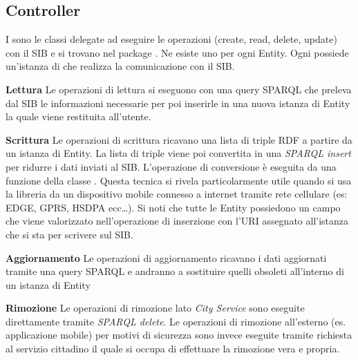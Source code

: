 \subsection{Controller}

I  sono le classi delegate ad eseguire le operazioni  (create, read, delete, update) con il SIB e si trovano nel package . Ne esiste uno per ogni Entity. Ogni  possiede un'istanza di  che realizza la comunicazione con il SIB. 

\begin{description}
	\item \textbf{Lettura} Le operazioni di lettura si eseguono con una query SPARQL che preleva dal SIB le informazioni necessarie per poi inserirle in una nuova istanza di Entity la quale viene restituita all'utente.

	\item \textbf{Scrittura} Le operazioni di scrittura ricavano una lista di triple RDF a partire da un istanza di Entity. La lista di triple viene poi convertita in una \emph{SPARQL insert} per ridurre i dati inviati al SIB. L'operazione di conversione è eseguita da una funzione della classe . Questa tecnica si rivela particolarmente utile quando si usa la libreria da un dispositivo mobile connesso a internet tramite rete cellulare (es: EDGE, GPRS, HSDPA ecc\dots). Si noti che tutte le Entity possiedono un campo  che viene valorizzato nell'operazione di inserzione con l'URI assegnato all'istanza che si sta per scrivere sul SIB. 

	\item \textbf{Aggiornamento} Le operazioni di aggiornamento ricavano i dati aggiornati tramite una query SPARQL e andranno a sostituire quelli obsoleti all'interno di un istanza di Entity

	\item \textbf{Rimozione} Le operazioni di rimozione lato \emph{City Service} sono eseguite direttamente tramite \emph{SPARQL delete}. Le operazioni di rimozione all'esterno (es. applicazione mobile) per motivi di sicurezza sono invece eseguite tramite richiesta al servizio cittadino il quale si occupa di effettuare la rimozione vera e propria.
\end{description}
	  















